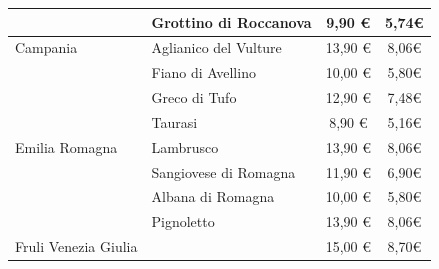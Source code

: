 \documentclass[12pt, a4paper]{article}
\begin{document}
\begin{longtable}{@{}|l|l|c|c|}
& Grottino di Roccanova                                                     & 9,90 €                                                          & 5,74€                                                                                 \\ \hline
Campania             & Aglianico del Vulture                                                     & 13,90 €                                                         & 8,06€                                                                                 \\ \hline
& Fiano di Avellino                                                         & 10,00 €                                                         & 5,80€                                                                                 \\ \hline
& Greco di Tufo                                                             & 12,90 €                                                         & 7,48€                                                                                 \\ \hline
& Taurasi                                                                   & 8,90 €                                                          & 5,16€                                                                                 \\ \hline
Emilia Romagna       & Lambrusco                                                                 & 13,90 €                                                         & 8,06€                                                                                 \\ \hline
& Sangiovese di Romagna                                                     & 11,90 €                                                         & 6,90€                                                                                 \\ \hline
& Albana di Romagna                                                         & 10,00 €                                                         & 5,80€                                                                                 \\ \hline
& Pignoletto                                                                & 13,90 €                                                         & 8,06€                                                                                 \\ \hline
Fruli Venezia Giulia &                                                                           & 15,00 €                                                         & 8,70€                                                                                 \\ \hline

\end{longtable}
\end{document}
